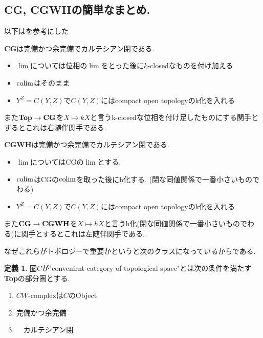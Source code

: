 \documentclass[dvipdfmx,a4paper,11pt]{article}
\newcommand{\colim}{{\rm colim}}
\theoremstyle{definition}
\newtheorem{dfn}[thm]{定義}
\begin{document}
\subsection{CG, CGWHの簡単なまとめ.}
以下は\cite{Fra}を参考にした

\begin{tcolorbox}
 [colback = white, colframe = green!35!black, fonttitle = \bfseries,breakable = true]
 {\bf CG}は完備かつ余完備でカルテシアン閉である.
 \begin{itemize}
 \item $\lim$については位相の$\lim$をとった後に$k$-closedなものを付け加える
 \item $\colim$はそのまま
 \item $Y^{Z} = C(Y,Z)$で$C(Y,Z)$にはcompact open topologyのk化を入れる
 \end{itemize}
 また$ {\bf Top}\to { \bf CG }$を$X \mapsto kX$と言うk-closedな位相を付け足したものにする関手とするとこれは右随伴関手である. 
\end{tcolorbox}

\begin{tcolorbox}
 [colback = white, colframe = green!35!black, fonttitle = \bfseries,breakable = true]
 {\bf CGWH}は完備かつ余完備でカルテシアン閉である.
 \begin{itemize}
 \item $\lim$についてはCGの$\lim$とする. 
 \item $\colim$はCGの$\colim$を取った後にh化する. (閉な同値関係で一番小さいものでわる)
 \item $Y^{Z} = C(Y,Z)$で$C(Y,Z)$にはcompact open topologyのk化を入れる
 \end{itemize}
  また$ {\bf CG}\to { \bf CGWH }$を$X \mapsto hX$と言うh化(閉な同値関係で一番小さいものでわる)に関手とするとこれは左随伴関手である. 
\end{tcolorbox}

なぜこれらがトポロジーで重要かというと次のクラスになっているからである.
\begin{tcolorbox}
 [colback = white, colframe = green!35!black, fonttitle = \bfseries,breakable = true]
 \begin{dfn}
圏$C$が"convenirnt category of topological space"とは次の条件を満たす{\bf Top}の部分圏とする.
\begin{enumerate}
\item $CW$-complexは$C$のObject
\item 完備かつ余完備
\item　カルテシアン閉
\end{enumerate}
  \end{dfn}
\end{tcolorbox}
\end{document}
